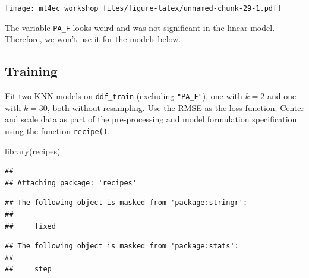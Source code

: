 \documentclass[
]{book}
\newenvironment{Shaded}{\begin{snugshade}}{\end{snugshade}}
\newcommand{\FunctionTok}[1]{\textcolor[rgb]{0.00,0.00,0.00}{#1}}
\newcommand{\NormalTok}[1]{#1}
\begin{document}
\texttt{[image: ml4ec\_workshop\_files/figure-latex/unnamed-chunk-29-1.pdf]}

The variable \texttt{PA\_F} looks weird and was not significant in the linear model. Therefore, we won't use it for the models below.

\hypertarget{training-2}{%
\subsection{Training}\label{training-2}}

Fit two KNN models on \texttt{ddf\_train} (excluding \texttt{"PA\_F"}), one with \(k = 2\) and one with \(k = 30\), both without resampling. Use the RMSE as the loss function. Center and scale data as part of the pre-processing and model formulation specification using the function \texttt{recipe()}.

\begin{Shaded}
\begin{Highlighting}[]
\FunctionTok{library}\NormalTok{(recipes)}
\end{Highlighting}
\end{Shaded}

\begin{verbatim}
## 
## Attaching package: 'recipes'
\end{verbatim}

\begin{verbatim}
## The following object is masked from 'package:stringr':
## 
##     fixed
\end{verbatim}

\begin{verbatim}
## The following object is masked from 'package:stats':
## 
##     step
\end{verbatim}
\end{document}
